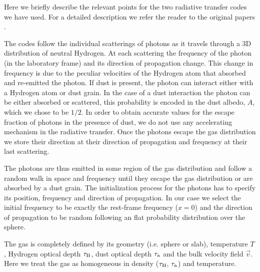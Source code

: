\documentclass{emulateapj}
\newcommand{\ly}{{\ifmmode{{\rm Ly}\alpha~}\else{Ly$\alpha$~}\fi}}
\begin{document}
Here we briefly describe the relevant points for the two radiative
transfer codes we have used. For a detailed description we refer the
reader to the original papers \cite{CLARA,DijkstraKramer}.

The codes follow the individual scatterings of \ly photons as it
travels through a 3D distribution of neutral Hydrogen. At each
scattering the frequency of the photon (in the laboratory frame) and
its direction of propagation change. This change in frequency is due
to the peculiar velocities of the Hydrogen atom that absorbed and
re-emitted the photon. If dust is present, the photon can interact
either with a Hydrogen atom or dust grain. In the case of a dust
interaction the photon can be either absorbed or scattered, this
probability is encoded in the dust albedo, $A$, which we chose to be
$1/2$. In order to obtain accurate values for the escape fraction of
photons in the presence of dust, we do not use any accelerating
mechanism in the radiative transfer. Once the photons escape the gas
distribution we store their direction at their direction of
propagation and frequency at their last scattering.

The photons are thus emitted in some region of the gas distribution
and follow a random walk in space and frequency until they escape the
gas distribution or are absorbed by a dust grain. The initialization
process for the \ly photons has to specify its position, frequency and
direction of propagation. In our case we select the initial frequency
to be exactly the \ly rest-frame frequency ($x=0$) and the direction of
propagation to be random following an flat probability distribution
over the sphere.


The gas is completely defined by its geometry (i.e. sphere or slab),
temperature $T$, Hydrogen optical depth $\tau_{\rm H}$, dust optical
depth $\tau_{\rm a}$ and the bulk velocity field $\vec{v}$. Here we
treat the gas as homogeneous in density ($\tau_{\rm H}$, $\tau_{\rm
a}$) and temperature.
\end{document}

